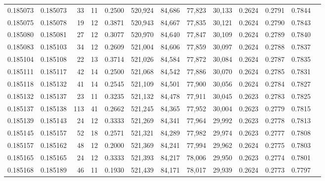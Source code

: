 \begin{tabular}{rrrrrrrrrrrrr}
0.185073 & 0.185073 &    33 &  11 &                                     0.2500 & 520,924 &  84,686 &  77,823 &  30,133 & 0.2624 & 0.2791 & 0.7844 \\
0.185075 & 0.185078 &    19 &  12 &                                     0.3871 & 520,943 &  84,667 &  77,835 &  30,121 & 0.2624 & 0.2790 & 0.7843 \\
0.185080 & 0.185081 &    27 &  12 &                                     0.3077 & 520,970 &  84,640 &  77,847 &  30,109 & 0.2624 & 0.2789 & 0.7840 \\
0.185083 & 0.185103 &    34 &  12 &                                     0.2609 & 521,004 &  84,606 &  77,859 &  30,097 & 0.2624 & 0.2788 & 0.7837 \\
0.185104 & 0.185108 &    22 &  13 &                                     0.3714 & 521,026 &  84,584 &  77,872 &  30,084 & 0.2624 & 0.2787 & 0.7835 \\
0.185111 & 0.185117 &    42 &  14 &                                     0.2500 & 521,068 &  84,542 &  77,886 &  30,070 & 0.2624 & 0.2785 & 0.7831 \\
0.185118 & 0.185132 &    41 &  14 &                                     0.2545 & 521,109 &  84,501 &  77,900 &  30,056 & 0.2624 & 0.2784 & 0.7827 \\
0.185132 & 0.185137 &    23 &  11 &                                     0.3235 & 521,132 &  84,478 &  77,911 &  30,045 & 0.2623 & 0.2783 & 0.7825 \\
0.185137 & 0.185138 &   113 &  41 &                                     0.2662 & 521,245 &  84,365 &  77,952 &  30,004 & 0.2623 & 0.2779 & 0.7815 \\
0.185139 & 0.185143 &    24 &  12 &                                     0.3333 & 521,269 &  84,341 &  77,964 &  29,992 & 0.2623 & 0.2778 & 0.7813 \\
0.185145 & 0.185157 &    52 &  18 &                                     0.2571 & 521,321 &  84,289 &  77,982 &  29,974 & 0.2623 & 0.2777 & 0.7808 \\
0.185157 & 0.185162 &    48 &  12 &                                     0.2000 & 521,369 &  84,241 &  77,994 &  29,962 & 0.2624 & 0.2775 & 0.7803 \\
0.185165 & 0.185165 &    24 &  12 &                                     0.3333 & 521,393 &  84,217 &  78,006 &  29,950 & 0.2623 & 0.2774 & 0.7801 \\
0.185168 & 0.185189 &    46 &  11 &                                     0.1930 & 521,439 &  84,171 &  78,017 &  29,939 & 0.2624 & 0.2773 & 0.7797 \\

\end{tabular}
